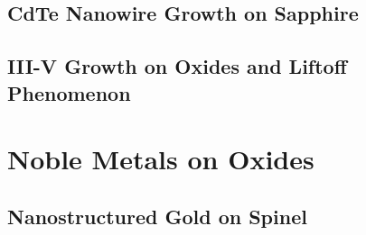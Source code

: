 \documentclass[letterpaper,10pt,twoside]{report}
\begin{document}
\chapter{CdTe Nanowire Growth on Sapphire}
 
\chapter{III-V Growth on Oxides and Liftoff Phenomenon}

\part{Noble Metals on Oxides}
\chapter{Nanostructured Gold on Spinel}



\printbibliography
\end{document}
